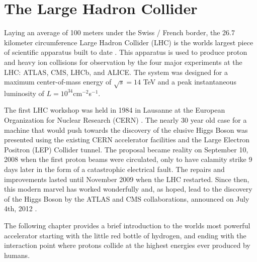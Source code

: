 \chapter{The Large Hadron Collider} \label{chap:lhc}

Laying an average of 100 meters under the Swiss / French border, the 26.7
kilometer circumference Large Hadron Collider (LHC) is the worlds largest piece
of scientific apparatus built to date \cite{Brüning:782076, Evans:2008zzb}.
This apparatus is used to produce proton and heavy ion collisions for
observation by the four major experiments at the LHC: ATLAS, CMS, LHCb, and
ALICE.  The system was designed for a maximum center-of-mass energy of
$\sqrt{s} = 14$ TeV and a peak instantaneous luminosity of $L = 10^{34} $cm$^{-2} $s$^{-1}$.  

The first LHC workshop was held in 1984 in Lausanne at the European
Organization for Nuclear Research (CERN) \cite{LlewellynSmith:2014lmn}.  The
nearly 30 year old case for a machine that would push towards the discovery of
the elusive Higgs Boson was presented using the existing CERN accelerator
facilities and the Large Electron Positron (LEP) Collider tunnel. The proposal
became reality on September 10, 2008 when the first proton beams were
circulated, only to have calamity strike 9 days later in the form of a
catastrophic electrical fault. The repairs and improvements lasted until
November 2009 when the LHC restarted.  Since then, this modern marvel has
worked wonderfully and, as hoped, lead to the discovery of the Higgs Boson by
the ATLAS and CMS collaborations, announced on July 4th, 2012
\cite{Aad:2012tfa, Chatrchyan:2012xdj, higgs_announcement}.

The following  chapter provides a brief introduction to the worlds most
powerful accelerator starting with the little red bottle of hydrogen, and
ending with the interaction point where protons collide at the highest energies
ever produced by humans.





